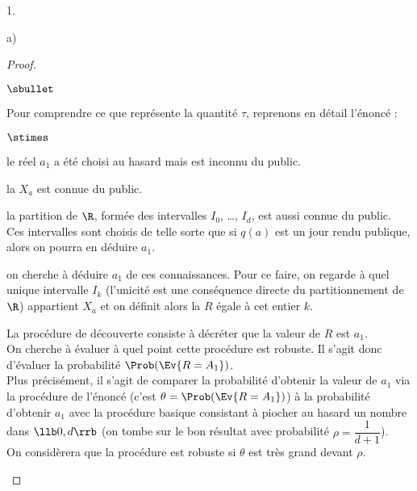 \documentclass[11pt]{article}%
\begin{document}
\begin{noliste}{1.}
\begin{noliste}{a)}
\begin{proof}
\begin{noliste}{$\sbullet$}
      \item Pour comprendre ce que représente la quantité $\tau$,
        reprenons en détail l'énoncé :
        \begin{noliste}{$\stimes$}
        \item le réel $a_1$ a été choisi au hasard mais est inconnu du 
	public.
        \item la \var $X_a$ est connue du public.
        \item la partition de $\R$, formée des intervalles $I_0$,
          \ldots, $I_d$, est aussi connue du public.\\
          Ces intervalles sont choisis de telle sorte que si $q(a)$
          est un jour rendu publique, alors on pourra en déduire $a_1$.
        \item on cherche à déduire $a_1$ de ces connaissances. Pour ce
          faire, on regarde à quel unique intervalle $I_k$ (l'unicité
          est une conséquence directe du partitionnement de $\R$)
          appartient $X_a$ et on définit alors la \var $R$ égale à cet 
          entier $k$.
        \end{noliste}
        La procédure de découverte consiste à décréter que la valeur 
        de $R$ est $a_1$.\\
	On cherche à évaluer à quel point cette procédure est robuste.
	Il s'agit donc d'évaluer la probabilité $\Prob(\Ev{R = 
	A_1})$.\\[.2cm]
        Plus précisément, il s'agit de comparer
        la probabilité d'obtenir la valeur de $a_1$ via la procédure
        de l'énoncé (c'est $\theta = \Prob(\Ev{R = A_1})$) à la
        probabilité d'obtenir $a_1$ avec la procédure basique
        consistant à piocher au hasard un nombre dans $\llb 0, d \rrb$
        (on tombe sur le bon résultat avec probabilité $\rho =
        \dfrac{1}{d+1}$).\\
        On considèrera que la procédure est robuste si $\theta$ est
        très grand devant $\rho$.


\end{noliste}
\end{proof}
\end{noliste}
\end{noliste}
\end{document}
